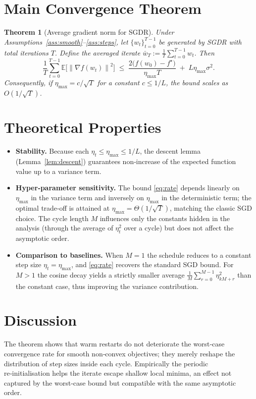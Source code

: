\documentclass[11pt]{article}
\newtheorem{theorem}{Theorem}
\newcommand{\E}{\mathbb{E}}
\newcommand{\norm}[1]{\left\lVert #1 \right\rVert}
\begin{document}
\section*{Main Convergence Theorem}
\begin{theorem}[Average gradient norm for SGDR]\label{thm:main}
Under Assumptions~\ref{ass:smooth}–\ref{ass:steps}, let $\{w_t\}_{t=0}^{T-1}$ be
generated by SGDR with total iterations $T$. Define the averaged iterate
$\bar w_T:=\frac1T\sum_{t=0}^{T-1}w_t$. Then
\begin{equation}\label{eq:rate}
\frac1T\sum_{t=0}^{T-1}\E\!\bigl[\norm{\nabla f(w_t)}^2\bigr]
\;\le\;
\frac{2\bigl(f(w_0)-f^\star\bigr)}{\eta_{\max}T}
\;+\;
L\eta_{\max}\sigma^2 .
\end{equation}
Consequently, if $\eta_{\max}=c/\sqrt{T}$ for a constant $c\le 1/L$, the bound
scales as $O(1/\sqrt{T})$.
\end{theorem}

\section*{Theoretical Properties}
\begin{itemize}[leftmargin=*]
\item \textbf{Stability.} Because each $\eta_t\le\eta_{\max}\le 1/L$, the
descent lemma (Lemma~\ref{lem:descent}) guarantees non‑increase of the expected
function value up to a variance term.
\item \textbf{Hyper‑parameter sensitivity.}
The bound \eqref{eq:rate} depends linearly on $\eta_{\max}$ in the variance term
and inversely on $\eta_{\max}$ in the deterministic term; the optimal trade‑off
is attained at $\eta_{\max}= \Theta(1/\sqrt{T})$, matching the classic SGD
choice.  The cycle length $M$ influences only the constants hidden in the
analysis (through the average of $\eta_t^2$ over a cycle) but does not affect the
asymptotic order.
\item \textbf{Comparison to baselines.}
When $M=1$ the schedule reduces to a constant step size $\eta_t=\eta_{\max}$,
and \eqref{eq:rate} recovers the standard SGD bound.  For $M>1$ the cosine
decay yields a strictly smaller average $\frac1M\sum_{r=0}^{M-1}\eta_{kM+r}^2$
than the constant case, thus improving the variance contribution.
\end{itemize}

\section*{Discussion}
The theorem shows that warm restarts do not deteriorate the worst‑case
convergence rate for smooth non‑convex objectives; they merely reshape the
distribution of step sizes inside each cycle.  Empirically the periodic
re‑initialisation helps the iterate escape shallow local minima, an effect not
captured by the worst‑case bound but compatible with the same asymptotic order.
\end{document}
